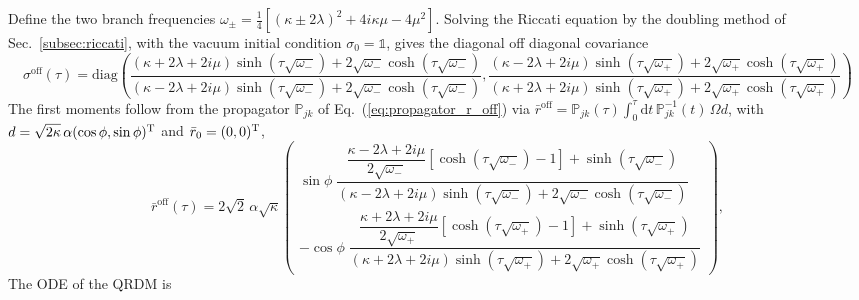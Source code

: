 \documentclass[%
reprint,
superscriptaddress,
nofootinbib,
 amsmath,amssymb,
prx,
floatfix,
]{revtex4-2}
\begin{document}
Define the two branch frequencies $
    \omega_{\pm} = 
    \frac{1}{4} \left[ (\kappa \pm 2 \lambda)^{2} + 4 i \kappa \mu - 4 \mu^{2} \right] $. Solving the
Riccati equation by the doubling method of Sec.~\ref{subsec:riccati}, with the vacuum
initial condition $\sigma_{0} = \mathds{1}$, gives the diagonal off diagonal covariance
\begin{equation}
    \sigma^{\text{off}} (\tau) = \text{diag} \left( 
        \frac{(\kappa + 2 \lambda + 2 i \mu) \sinh \left( \tau \sqrt{\omega_{-}} \right)
        + 2 \sqrt{\omega_{-}} \cosh \left( \tau \sqrt{\omega_{-}} \right)}
        {(\kappa - 2 \lambda + 2 i \mu) \sinh \left( \tau \sqrt{\omega_{-}} \right)
        + 2 \sqrt{\omega_{-}} \cosh \left( \tau \sqrt{\omega_{-}} \right)} ,
       \frac{(\kappa - 2 \lambda + 2 i \mu) \sinh \left( \tau \sqrt{\omega_{+}} \right)
        + 2 \sqrt{\omega_{+}} \cosh \left( \tau \sqrt{\omega_{+}} \right)}
        {(\kappa + 2 \lambda + 2 i \mu) \sinh \left( \tau \sqrt{\omega_{+}} \right)
        + 2 \sqrt{\omega_{+}} \cosh \left( \tau \sqrt{\omega_{+}} \right)}
    \right) \nonumber
\end{equation}
The first moments follow from the propagator $\mathds{P}_{jk}$ of Eq.~(\ref{eq:propagator_r_off})
via $\bar{r}^{\text{off}} = \mathds{P}_{jk} (\tau) \int_{0}^{\tau} \text{d} t \,
\mathds{P}^{-1}_{jk} (t) \, \Omega d$, with $d = \sqrt{2 \kappa} \, \alpha (\cos \phi , \sin \phi)^{\rm T}$
and $\bar{r}_0 = (0,0)^{\rm T}$, 
\begin{equation}
    \bar{r}^{\text{off}} (\tau) = 2 \sqrt{2} \, \alpha \sqrt{\kappa}
    \begin{pmatrix}
        \sin \phi \;
        \dfrac{\dfrac{\kappa - 2 \lambda + 2 i \mu}{2 \sqrt{\omega_{-}}}
        \left[ \cosh \left( \tau \sqrt{\omega_{-}} \right) - 1 \right]
        + \sinh \left( \tau \sqrt{\omega_{-}} \right)}
        {(\kappa - 2 \lambda + 2 i \mu) \sinh \left( \tau \sqrt{\omega_{-}} \right)
        + 2 \sqrt{\omega_{-}} \cosh \left( \tau \sqrt{\omega_{-}} \right)} \\[24pt]
        - \cos \phi \;
        \dfrac{\dfrac{\kappa + 2 \lambda + 2 i \mu}{2 \sqrt{\omega_{+}}}
        \left[ \cosh \left( \tau \sqrt{\omega_{+}} \right) - 1 \right]
        + \sinh \left( \tau \sqrt{\omega_{+}} \right)}
        {(\kappa + 2 \lambda + 2 i \mu) \sinh \left( \tau \sqrt{\omega_{+}} \right)
        + 2 \sqrt{\omega_{+}} \cosh \left( \tau \sqrt{\omega_{+}} \right)}
    \end{pmatrix} ,
\end{equation}
The ODE of the QRDM is
\end{document}
